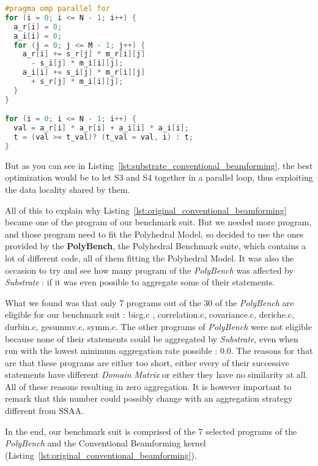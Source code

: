 \documentclass[paper=a4, fontsize=11.5pt]{scrartcl}
\numberwithin{equation}{section}        %
\numberwithin{figure}{section}          %
\numberwithin{table}{section}               %
\begin{document}
\hfill
\begin{minipage}[t]{0.45\textwidth}
\begin{lstlisting}[frame=single, language=C, basicstyle=\scriptsize, caption={Goal version of Conventional Beamforming kernel}, label={lst:substrate_conventional_beamforming}]
#pragma omp parallel for
for (i = 0; i <= N - 1; i++) {
  a_r[i] = 0;
  a_i[i] = 0;
  for (j = 0; j <= M - 1; j++) {
    a_r[i] += s_r[j] * m_r[i][j]
      - s_i[j] * m_i[i][j];
    a_i[i] += s_i[j] * m_r[i][j]
      + s_r[j] * m_i[i][j];
  }
}

for (i = 0; i <= N - 1; i++) {
  val = a_r[i] * a_r[i] + a_i[i] * a_i[i];
  t = (val >= t_val)? (t_val = val, i) : t;
}
\end{lstlisting}
\end{minipage}
But as you can see in Listing~\ref{lst:substrate_conventional_beamforming}, the best optimization
would be to let S3 and S4 together in a parallel loop, thus exploiting the data locality
shared by them.

\bigskip

All of this to explain why Listing~\ref{lst:original_conventional_beamforming} became one
of the program of our benchmark suit. But we needed more program, and those program need to
fit the Polyhedral Model, so decided to use the ones provided by the \textbf{PolyBench},
the Polyhedral Benchmark suite, which contains a lot of different code, all of them fitting
the Polyhedral Model. It was also the occasion to try and see how many program of the \textit{PolyBench}
was affected by \textit{Substrate} : if it was even possible to aggregate some of their statements.

What we found was that only 7 programs out of the 30 of the \textit{PolyBench} are eligible
 for our benchmark suit : bicg.c , correlation.c, covariance.c, deriche.c, durbin.c, gesummv.c, symm.c.
The other programs of \textit{PolyBench} were not eligible because none of their statements could be
aggregated by \textit{Substrate}, even when run with the lowest minimum aggregation rate possible : 0.0.
The reasons for that are that these programs are either too short, either every of their
successive statements have different \textit{Domain Matrix} or either they have no similarity at all.
All of these reasons resulting in zero aggregation. It is however important to remark that
this number could possibly change with an aggregation strategy different from SSAA.

\bigskip

In the end, our benchmark suit is comprised of the 7 selected programs of the \textit{PolyBench}
and the Conventional Beamforming kernel (Listing~\ref{lst:original_conventional_beamforming}).
\end{document}
